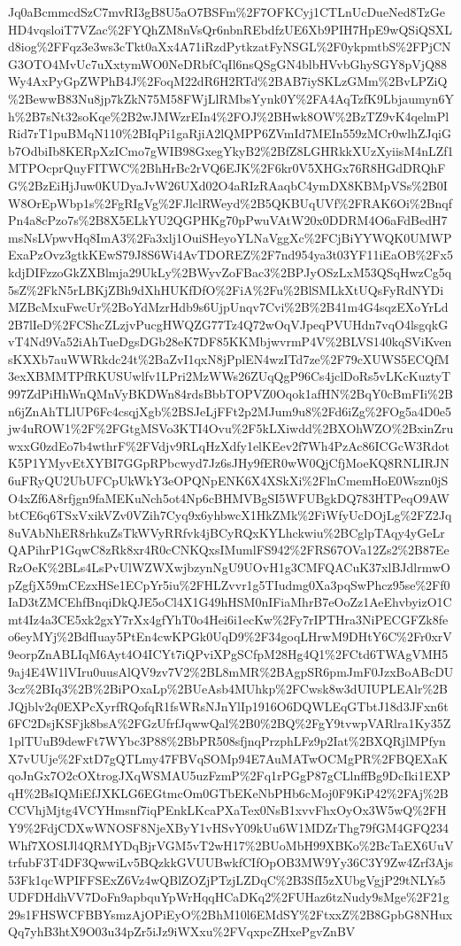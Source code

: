 \documentclass[11pt]{article}
\begin{document}
Jq0aBcmmcdSzC7mvRI3gB8U5aO7BSFm\%2F7OFKCyj1CTLnUcDueNed8TzGeHD4vqsloiT7VZac\%2FYQhZM8nVsQr6nbnREbdfzUE6Xb9PIH7HpE9wQSiQSXLd8iog\%2FFqz3e3ws3cTkt0aXx4A71iRzdPytkzatFyNSGL\%2F0ykpmtbS\%2FPjCNG3OTO4MvUc7uXxtymWO0NeDRbfCqIl6nsQSgGN4blbHVvbGhySGY8pVjQ88Wy4AxPyGpZWPhB4J\%2FoqM22dR6H2RTd\%2BAB7iySKLzGMm\%2BvLPZiQ\%2BewwB83Nu8jp7kZkN75M58FWjLlRMbsYynk0Y\%2FA4AqTzfK9Lbjaumyn6Yh\%2B7sNt32soKqe\%2B2wJMWzrEIn4\%2FOJ\%2BHwk8OW\%2BzTZ9vK4qelmPlRid7rT1puBMqN110\%2BIqPi1gaRjiA2lQMPP6ZVmId7MEIn559zMCr0wlhZJqiGb7OdbiIb8KERpXzICmo7gWIB98GxegYkyB2\%2BfZ8LGHRkkXUzXyiisM4nLZf1MTPOcprQuyFITWC\%2BhHrBc2rVQ6EJK\%2F6kr0V5XHGx76R8HGdDRQhFG\%2BzEiHjJuw0KUDyaJvW26UXd02O4aRIzRAaqbC4ymDX8KBMpVSs\%2B0IW8OrEpWbp1s\%2FgRIgVg\%2FJlclRWeyd\%2B5QKBUqUVf\%2FRAK6Oi\%2BnqfPn4a8cPzo7s\%2B8X5ELkYU2QGPHKg70pPwuVAtW20x0DDRM4O6aFdBedH7msNsLVpwvHq8ImA3\%2Fa3xlj1OuiSHeyoYLNaVggXc\%2FCjBiYYWQK0UMWPExaPzOvz3gtkKEwS79J8S6Wi4AvTDOREZ\%2F7nd954ya3t03YF11iEaOB\%2Fx5kdjDIFzzoGkZXBlmja29UkLy\%2BWyvZoFBac3\%2BPJyOSzLxM53QSqHwzCg5q5sZ\%2FkN5rLBKjZBh9dXhHUKfDfO\%2FiA\%2Fu\%2BlSMLkXtUQsFyRdNYDiMZBcMxuFwcUr\%2BoYdMzrHdb9s6UjpUnqv7Cvi\%2B\%2B41m4G4sqzEXoYrLd2B7lIeD\%2FCShcZLzjvPucgHWQZG77Tz4Q72wOqVJpeqPVUHdn7vqO4lsgqkGvT4Nd9Va52iAhTueDgsDGb28eK7DF85KKMbjwvrmP4V\%2BLVS140kqSViKvensKXXb7auWWRkdc24t\%2BaZvI1qxN8jPplEN4wzITd7ze\%2F79cXUWS5ECQfM3exXBMMTPfRKUSUwlfv1LPri2MzWWs26ZUqQgP96Cs4jclDoRs5vLKcKuztyT997ZdPiHhWnQMnVyBKDWn84rdsBbbTOPVZ0Oqok1afHN\%2BqY0cBmFIi\%2Bn6jZnAhTLlUP6Fc4csqjXgb\%2BSJeLjFFt2p2MJum9u8\%2Fd6iZg\%2FOg5a4D0e5jw4uROW1\%2F\%2FGtgMSVo3KTI4Ovu\%2F5kLXiwdd\%2BXOhWZO\%2BxinZruwxxG0zdEo7b4wthrF\%2FVdjv9RLqHzXdfy1elKEev2f7Wh4PzAc86ICGcW3RdotK5P1YMyvEtXYBI7GGpRPbcwyd7Jz6sJHy9fER0wW0QjCfjMoeKQ8RNLIRJN6uFRyQU2UbUFCpUkWkY3eOPQNpENK6X4XSkXi\%2FlnCmemHoE0Wszn0jSO4xZf6A8rfjgn9faMEKuNch5ot4Np6cBHMVBgSI5WFUBgkDQ783HTPeqO9AWbtCE6q6TSxVxikVZv0VZih7Cyq9x6yhbwcX1HkZMk\%2FiWfyUcDOjLg\%2FZ2Jq8uVAbNhER8rhkuZsTkWVyRRfvk4jBCyRQxKYLhckwiu\%2BCglpTAqy4yGeLrQAPihrP1GqwC8zRk8xr4R0cCNKQxsIMumlFS942\%2FRS67OVa12Zs2\%2B87EeRzOeK\%2BLs4LsPvUlWZWXwjbzynNgU9UOvH1g3CMFQACuK37xlBJdlrmwOpZgfjX59mCEzxHSe1ECpYr5iu\%2FHLZvvr1g5TIudmg0Xa3pqSwPhcz95se\%2Ff0IaD3tZMCEhfBnqiDkQJE5oCl4X1G49hHSM0nIFiaMhrB7eOoZz1AeEhvbyizO1Cmt4Iz4a3CE5xk2gxY7rXx4gfYhT0o4Hei6i1ecKw\%2Fy7rIPTHra3NiPECGFZk8feo6eyMYj\%2BdfIuay5PtEn4cwKPGk0UqD9\%2F34goqLHrwM9DHtY6C\%2Fr0xrV9eorpZnABLIqM6Ayt4O4ICYt7iQPviXPgSCfpM28Hg4Q1\%2FCtd6TWAgVMH59aj4E4W1lVIru0uusAlQV9zv7V2\%2BL8mMR\%2BAgpSR6pmJmF0JzxBoABcDU3cz\%2BIq3\%2B\%2BiPOxaLp\%2BUeAsb4MUhkp\%2FCwsk8w3dUIUPLEAlr\%2BJQjblv2q0EXPcXyrfRQofqR1fsWRsNJnYlIp1916O6DQWLEqGTbtJ18d3JFxn6t6FC2DsjKSFjk8bsA\%2FGzUfrfJqwwQal\%2B0\%2BQ\%2FgY9tvwpVARlra1Ky35Z1plTUuB9dewFt7WYbc3P88\%2BbPR508sfjnqPrzphLFz9p2Iat\%2BXQRjlMPfynX7vUUje\%2FxtD7gQTLmy47FBVqSOMp94E7AuMATwOCMgPR\%2FBQEXaKqoJnGx7O2cOXtrogJXqWSMAU5uzFzmP\%2Fq1rPGgP87gCLlnffBg9DcIki1EXPqH\%2BsIQMiEfJXKLG6EGtmcOm0GTbEKeNbPHb6cMoj0F9KiP42\%2FAj\%2BCCVhjMjtg4VCYHmsnf7iqPEnkLKcaPXaTex0NsB1xvvFhxOyOx3W5wQ\%2FHY9\%2FdjCDXwWNOSF8NjeXByY1vHSvY09kUu6W1MDZrThg79fGM4GFQ234Whf7XOSIJl4QRMYDqBjrVGM5vT2wH17\%2BUoMbH99XBKo\%2BcTaEX6UuVtrfubF3T4DF3QwwiLv5BQzkkGVUUBwkfCIfOpOB3MW9Yy36C3Y9Zw4Zrf3Ajs53Fk1qcWPIFFSExZ6Vz4wQBlZOZjPTzjLZDqC\%2B3SfI5zXUbgVgjP29tNLYs5UDFDHdhVV7DoFn9apbquYpWrHqqHCaDKq2\%2FUHaz6tzNudy9sMge\%2F21g29s1FHSWCFBBYsmzAjOPiEyO\%2BhM10l6EMdSY\%2FtxxZ\%2B8GpbG8NHuxQq7yhB3htX9O03u34pZr5iJz9iWXxu\%2FVqxpcZHxePgvZnBV
\end{document}

